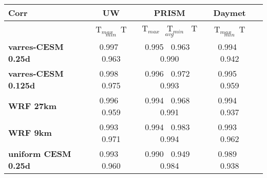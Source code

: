 \begin{table}
\begin{center}
\begin{tabular}{lcccc}
\hline \textbf{Corr} & \textbf{UW}  & \textbf{PRISM} & \textbf{Daymet} \\
\hline $    $ & T$_{max}$ $\     $  T$_{min}$ & T$_{max}$ $\     $  T$_{min}$ $\     $ T$_{avg}$& T$_{max}$ $\     $  T$_{min}$\\
\hline \textbf{varres-CESM 0.25d} & 0.997 $\ $ 0.963 & 0.995 $\ $ 0.963 $\ $ 0.990 & 0.994 $\ $ 0.942 \\
\textbf{varres-CESM 0.125d} & 0.998 $\ $ 0.975 & 0.996 $\ $ 0.972 $\ $ 0.993 & 0.995 $\ $ 0.959 \\
\textbf{WRF 27km} & 0.996 $\ $ 0.959 & 0.994 $\ $ 0.968 $\ $ 0.991 & 0.994 $\ $ 0.937 \\
\textbf{WRF 9km} & 0.993 $\ $ 0.971 & 0.994 $\ $ 0.983 $\ $ 0.994 & 0.993 $\ $ 0.962 \\
\textbf{uniform CESM 0.25d} & 0.993 $\ $ 0.960 & 0.990 $\ $ 0.949 $\ $ 0.984 & 0.989 $\ $ 0.938 \\
\hline
\end{tabular}
\end{center}
\end{table}

